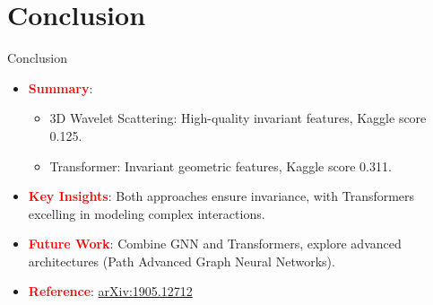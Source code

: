 \documentclass[10pt]{beamer}
\begin{document}
\section{Conclusion}
\begin{frame}{Conclusion}
  \vspace{0.2cm}
  \begin{itemize}
    \item \textcolor{red}{\textbf{Summary}}:
      \begin{itemize}
        \item 3D Wavelet Scattering: High-quality invariant features, Kaggle score 0.125.
        \vspace{0.15cm}
        \item Transformer: Invariant geometric features, Kaggle score 0.311.
      \end{itemize}
    \vspace{0.2cm}
    \item \textcolor{red}{\textbf{Key Insights}}: Both approaches ensure invariance, with Transformers excelling in modeling complex interactions.
    \vspace{0.2cm}
    \item \textcolor{red}{\textbf{Future Work}}: Combine GNN and Transformers, explore advanced architectures (Path Advanced Graph Neural Networks).
    \item \textcolor{red}{\textbf{Reference}}: \href{https://arxiv.org/pdf/1905.12712}{arXiv:1905.12712}
      
  \end{itemize}
  \vspace{0.2cm}
\end{frame}
\end{document}
